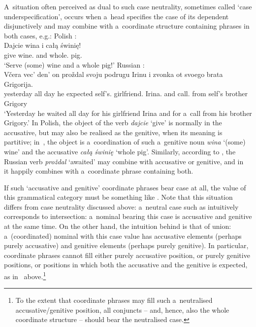 \documentclass[output=paper]{langsci/langscibook}
\begin{document}
A~situation often perceived as dual to such case neutrality, sometimes called `case underspecification’, occurs when a~head specifies the case of its dependent disjunctively and may combine with a~coordinate structure containing phrases in both cases, e.g.:
\ea
\label{ex:dis:pl} Polish \citep[175]{Prze99b}: \\ [1ex]
\gll Dajcie wina i całą świnię! \\
    give wine.\GEN{} and whole.\ACC{} pig.\ACC{}\\
\glt  `Serve (some) wine and a whole pig!’
\z
\ea
\label{ex:dis:ru} Russian \citep[11]{levy:01}: \\ [1ex]
\gll V{\v c}era vec' den' on pro{\v z}dal svoju podrugu Irinu i zvonka ot svoego brata Grigorija. \\
    yesterday all day he expected self's.\ACC{} girlfriend.\ACC{} Irina.\ACC{} and call.\GEN{} from self's brother Grigory\\
\glt  `Yesterday he waited all day for his girlfriend Irina and for a~call from his brother Grigory.’
\z
In Polish, the object of the verb \emph{dajcie} `give’ is normally in the accusative, but may also be realised as the genitive, when its meaning is partitive; in~, the object is a~coordination of such a~genitive noun \emph{wina} `(some) wine’ and the accusative \emph{całą świnię} `whole pig’.  Similarly, according to \citealt{levy:01}, the Russian verb \emph{pro{\v z}dal} `awaited’ may combine with accusative or genitive, and in~ it happily combines with a~coordinate phrase containing both.

If such `accusative and genitive’ coordinate phrases bear case at all, the value of this grammatical category must be something like .  Note that this situation differs from case neutrality discussed above: a~neutral case such as  intuitively corresponds to intersection: a~nominal bearing this case is accusative and genitive at the same time.  On the other hand, the intuition behind  is that of union: a~(coordinated) nominal with this case value has accusative elements (perhaps purely accusative) and genitive elements (perhaps purely genitive).  In particular,  coordinate phrases cannot fill either purely accusative position, or purely genitive positions, or positions in which both the accusative and the genitive is expected, as in~ above.\footnote{To the extent that coordinate phrases may fill such a~neutralised accusative/genitive position, all conjuncts – and, hence, also the whole coordinate structure – should bear the neutralised  case.}
\end{document}
